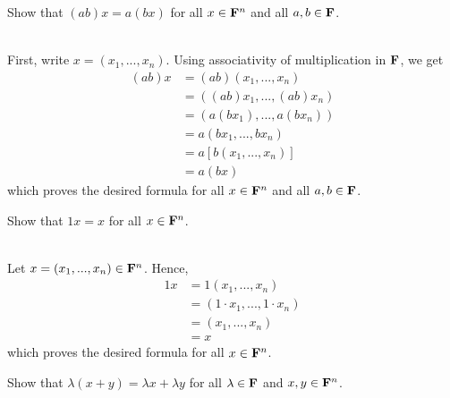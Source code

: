 \begin{exercise}
    Show that $(ab)x = a(bx)$ for all $x \in \mathbf{F}^n$ and all $a,b \in \mathbf{F}$.\\
\end{exercise}

\begin{solution}
    \\ First, write $x = (x_1, ..., x_n)$. Using associativity of multiplication in $\mathbf{F}$, we get
    \begin{align*}
        (ab)x &= (ab)(x_1, ..., x_n) \\
        &= ((ab)x_1, ..., (ab)x_n) \\
        &= (a(bx_1), ..., a(bx_n)) \\
        &= a(bx_1, ..., bx_n) \\
        &= a[b(x_1, ..., x_n)] \\
        &= a(bx)
    \end{align*}
    which proves the desired formula for all $x \in \mathbf{F}^n$ and all $a,b \in \mathbf{F}$.\\
\end{solution}

\begin{exercise}
    Show that $1x = x$ for all $x \in \mathbf{F}^n$.\\
\end{exercise}

\begin{solution}
    \\ Let $x = (x_1, ..., x_n) \in \mathbf{F}^n$. Hence,
    \begin{align*}
        1x &= 1(x_1, ..., x_n) \\
        &= (1\cdot x_1, ..., 1 \cdot x_n) \\
        &= (x_1, ..., x_n) \\
        &= x
    \end{align*}
    which proves the desired formula for all $x \in \mathbf{F}^n$.\\
\end{solution}

\begin{exercise}
    Show that $\lambda(x+y) = \lambda x + \lambda y$ for all $\lambda \in \mathbf{F}$ and $x,y \in \mathbf{F}^n$.\\
\end{exercise}

